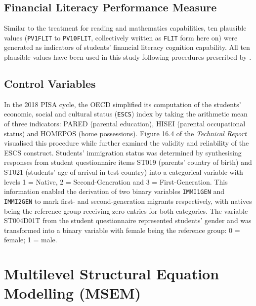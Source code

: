 \documentclass[a4paper,11pt,UKenglish,twoside,openright]{report}\usepackage[]{graphicx}\usepackage[]{color}
\begin{document}
\subsection{Financial Literacy Performance Measure}

Similar to the treatment for reading and mathematics capabilities, ten plausible values (\texttt{PV1FLIT} to \texttt{PV10FLIT}, collectively written as \texttt{FLIT} form here on) were generated as indicators of students' financial literacy cognition capability. All ten plausible values have been used in this study following procedures prescribed by \textcite{rubin:1987}.

\subsection{Control Variables}

In the 2018 PISA cycle, the OECD simplified its computation of the students' economic, social and cultural status (\texttt{ESCS}) index by taking the arithmetic mean of three indicators: \textsf{PARED} (parental education), \textsf{HISEI} (parental occupational status) and \textsf{HOMEPOS} (home possessions). Figure 16.4 of the \textit{Technical Report} \parencite{PISAtech} visualised this procedure while \textcite{avvisati:2020} further exmined the validity and reliability of the ESCS construct. Students' immigration status was determined by synthesising responses from student questionnaire items \textsf{ST019} (parents' country of birth) and \textsf{ST021} (students' age of arrival in test country) \parencite[][pp. 212--213]{PISAvol3} into a categorical variable with levels \textsf{1 = Native}, \textsf{2 = Second-Generation} and \textsf{3 = First-Generation}. This information enabled the derivation of two binary variables \texttt{IMMI1GEN} and \texttt{IMMI2GEN} to mark first- and second-generation migrants respectively, with natives being the reference group receiving zero entries for both categories. The variable \textsf{ST004D01T} from the student questionnaire \parencite{FLdata} represented students' gender and was transformed into a binary variable with female being the reference group: \textsf{0 = female}; \textsf{1 = male}.

\section{Multilevel Structural Equation Modelling (MSEM)}
\end{document}
